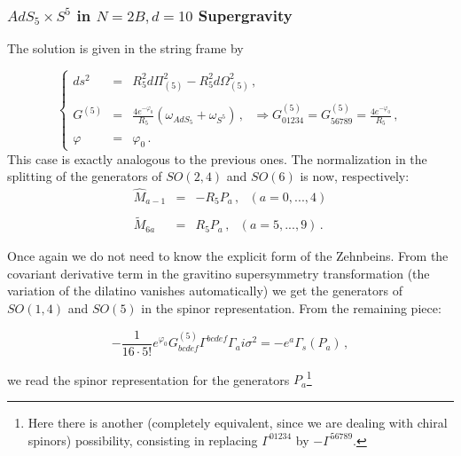 \documentclass[12pt,a4paper]{article}
\begin{document}

\subsubsection{$AdS_{5}\times S^{5}$ in $N=2B,d=10$ Supergravity}

The solution is given in the string frame by

\begin{equation}
  \left\{
  \begin{array}{rcl}
  ds^2&=&R_5^2d\Pi_{(5)}^2-R_5^2d\Omega_{(5)}^2\, , \\ \\ 
  G^{(5)}&=&\frac{4e^{-\varphi_0}}{R_5}(\omega_{AdS_5}+\omega_{S^5})\, , 
  \ \ \ \Rightarrow 
  G^{(5)}_{01234}=G^{(5)}_{56789}=\frac{4e^{-\varphi_0}}{R_5}\, , \\ \\ 
  \varphi&=&\varphi_0\, .  
  \end{array}
  \right.
\end{equation}
This case is exactly analogous to the previous ones. The  
normalization in the splitting of the generators of $SO(2,4)$ and 
$SO(6)$ is now, respectively:
\begin{equation}
  \begin{array}{rcl}
  \hat{M}_{a-1}&=&-R_5P_a\, , \ \ \ (a=0,...,4) \\ \\ 
  \tilde{M}_{6a}&=&R_5P_a\, , \ \ \ (a=5,...,9)\, .
  \end{array}
\end{equation}

Once again we do not need to know the explicit form of the Zehnbeins. 
From the covariant derivative term in the gravitino supersymmetry 
transformation (the variation of the dilatino vanishes automatically) 
we get the generators of $SO(1,4)$ and $SO(5)$ in the spinor 
representation. From the remaining piece: 

\begin{equation}
  -\textstyle\frac{1}{16\cdot 5!}e^{\varphi_0}G^{(5)}_{bcdef}
  \Gamma^{bcdef}\Gamma_ai\sigma^2 = -e^a\Gamma_{s}(P_a)\, ,
\end{equation}

\noindent
we read the spinor representation for the generators
$P_a$\footnote{Here there is another (completely equivalent, since we
  are dealing with chiral spinors) possibility, consisting in replacing
  $\Gamma^{01234}$ by $-\Gamma^{56789}$. }
\end{document}
